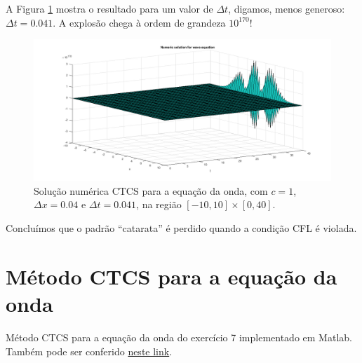 \documentclass{article}
\begin{document}
\begin{enumerate}
            \clearpage

            A Figura \ref{fig:wave_5} mostra o resultado para um valor de
            $\Delta t$, digamos, menos generoso: $\Delta t = 0.041$. A explosão
            chega à ordem de grandeza $10^{170}$!

            \begin{figure}[!h]
                \centerline{
                    \includegraphics[width=1.4\textwidth]{images/wave_5.png}
                }
                \caption{Solução numérica CTCS para a equação da onda, com $c = 1$,
                $\Delta x = 0.04$ e $\Delta t = 0.041$, na região $[-10, 10] \times [0, 40]$.}
                \label{fig:wave_5}
            \end{figure}

            Concluímos que o padrão ``catarata'' é perdido quando a condição
            CFL é violada.


    \end{enumerate}

    \clearpage

    \appendix

    \section{Método CTCS para a equação da onda}
        \label{appendix:ctcs}

        Método CTCS para a equação da onda do exercício 7 implementado
        em Matlab.
        Também pode ser conferido
        \href{https://github.com/lucasresck/introduction-to-numerical-analysis/blob/master/list_5/ctcs_7.m}{neste link}.
\end{document}
